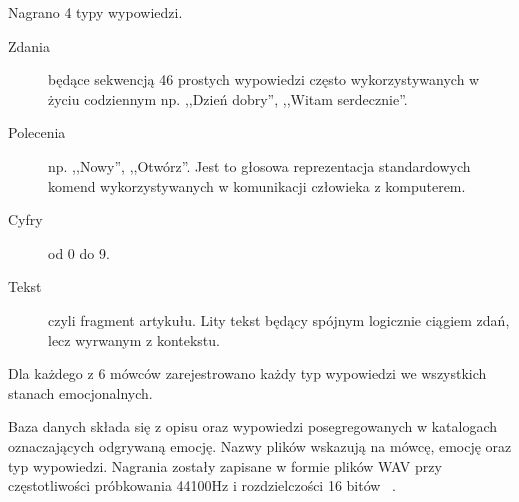 \documentclass[a4paper,12pt,twoside,openany]{report}
\begin{document}
Nagrano 4 typy wypowiedzi.
\begin{description}
	\item [Zdania] będące sekwencją 46 prostych wypowiedzi często wykorzystywanych w życiu codziennym 
		np. ,,Dzień dobry'', ,,Witam serdecznie''. 
	\item [Polecenia]  np. ,,Nowy'', ,,Otwórz''. 
		Jest to głosowa reprezentacja standardowych komend wykorzystywanych w komunikacji człowieka z komputerem.
	\item [Cyfry] od 0 do 9.
	\item [Tekst] czyli fragment artykułu. 
		Lity tekst będący spójnym logicznie ciągiem zdań, lecz wyrwanym z kontekstu.
\end{description}
Dla każdego z 6 mówców zarejestrowano każdy typ wypowiedzi we wszystkich stanach emocjonalnych.

Baza danych składa się z opisu oraz wypowiedzi posegregowanych w katalogach oznaczających odgrywaną emocję.
Nazwy plików wskazują na mówcę, emocję oraz typ wypowiedzi.
Nagrania zostały zapisane w formie plików WAV przy częstotliwości próbkowania 44100Hz i rozdzielczości 16 bitów ~\cite{Igras2009}.
\end{document}
